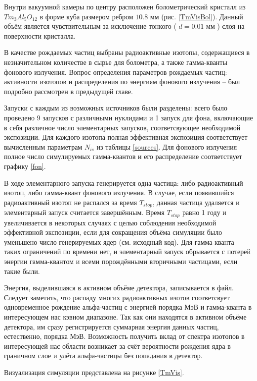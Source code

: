 \documentclass[a4paper,article,14pt]{extarticle}
\begin{document}
Внутри вакуумной камеры по центру расположен болометрический кристалл из $Tm_3Al_5O_{12}$ в форме куба размером ребром $ 10.8 \text{ мм}$ (рис. \ref{TmVisBol}). Данный объём является чувствительным за исключение тонкого ( $d = 0.01 \text{ мм}$ ) слоя на поверхности кристалла. 

В качестве рождаемых частиц выбраны радиоактивные изотопы, содержащиеся в незначительном количестве в сырье для болометра, а также гамма-кванты фонового излучения. Вопрос определения параметров рождаемых частиц: активности изотопов и распределения по энергиям фонового излучения -- был подробно рассмотрен в предыдущей главе.

Запуски с каждым из возможных источников были разделены: всего было проведено 9 запусков с различными нуклидами и 1 запуск для фона, включающие в себя различное число элементарных запусков, соответсвующее необходимой экспозиции. Для каждого изотопа полная эффективная экспозиция соответствует вычисленным параметрам $N_{is}$ из таблицы \ref{sources}. Для фонового излучения полное число симулируемых гамма-квантов и его распределение соответствует графику \ref{fon}.

В ходе элементарного запуска генерируется одна частица: либо радиоактивный изотоп, либо гамма-квант фонового излучения. В случае, если появившийся радиоактивный изотоп не распался за время $T_{stop}$, данная частица удаляется и элементарный запуск считается завершённым. Время $T_{stop}$ равно 1 году и увеличивается в некоторых случаях с целью соблюдения необходимой эффективной экспозиции, если  для сокращения объёма симуляции было уменьшено число генерируемых ядер (см. исходный код). Для гамма-кванта таких ограничений по времени нет, и элементарный запуск обрывается с потерей энергии гамма-квантом и всеми порождёнными вторичными частицами, если такие были.

Энергия, выделившаяся в активном объёме детектора, записывается в файл. Следует заметить, что распаду многих радиоактивных изотов соответсвует одновременное рождение альфа-частиц с энергией порядка МэВ и гамма-кванта в интересующем нас кэвном диапазоне. Так как они находятся в активном объёме детектора, им сразу регистрируется суммарная энергия данных частиц, естественно, порядка МэВ. Возможность получить вклад от спектра изотопов в интересующей нас области возникает за счёт вероятности рождения ядра в граничном слое и улёта альфа-частицы без попадания в детектор.

Визуализация симуляции представлена на рисунке \ref{TmVis}.
\end{document}
